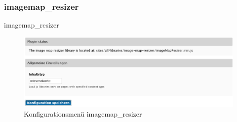 \subsubsection{imagemap\_resizer}\label{subsub:imagemapresizer}
imagemap\_resizer
\begin{figure}[H]
	\centering
	\includegraphics[width=0.70\linewidth]{images/config_imagemapresizer}
	\caption[]{Konfigurationsmenü imagemap\_resizer}
	\label{fig:config_imagemapresizer}
\end{figure}



